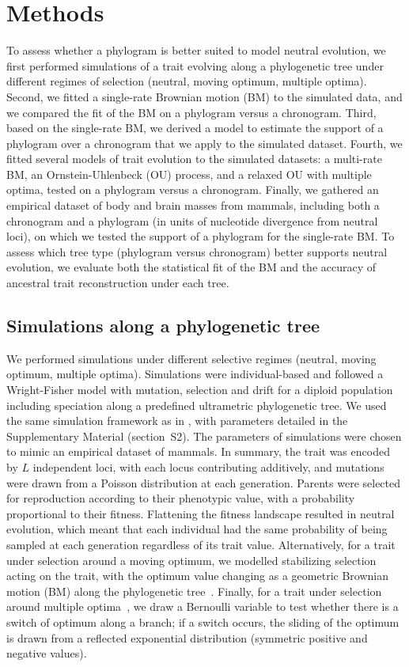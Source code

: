 \documentclass{article}
\newcommand{\NbrLoci}{L}
\begin{document}
\section*{Methods}
To assess whether a phylogram is better suited to model neutral evolution, we first performed simulations of a trait evolving along a phylogenetic tree under different regimes of selection (neutral, moving optimum, multiple optima).
Second, we fitted a single-rate Brownian motion (BM) to the simulated data, and we compared the fit of the BM on a phylogram versus a chronogram.
Third, based on the single-rate BM, we derived a model to estimate the support of a phylogram over a chronogram that we apply to the simulated dataset.
Fourth, we fitted several models of trait evolution to the simulated datasets: a multi-rate BM, an Ornstein-Uhlenbeck (OU) process, and a relaxed OU with multiple optima, tested on a phylogram versus a chronogram.
Finally, we gathered an empirical dataset of body and brain masses from mammals, including both a chronogram and a phylogram (in units of nucleotide divergence from neutral loci), on which we tested the support of a phylogram for the single-rate BM.
To assess which tree type (phylogram versus chronogram) better supports neutral evolution, we evaluate both the statistical fit of the BM and the accuracy of ancestral trait reconstruction under each tree.

\subsection*{Simulations along a phylogenetic tree}
We performed simulations under different selective regimes (neutral, moving optimum, multiple optima).
Simulations were individual-based and followed a Wright-Fisher model with mutation, selection and drift for a diploid population including speciation along a predefined ultrametric phylogenetic tree.
We used the same simulation framework as in \citet{latrille_detecting_2024}, with parameters detailed in the Supplementary Material (section~S2).
The parameters of simulations were chosen to mimic an empirical dataset of mammals.
In summary, the trait was encoded by $\NbrLoci$ independent loci, with each locus contributing additively, and mutations were drawn from a Poisson distribution at each generation.
Parents were selected for reproduction according to their phenotypic value, with a probability proportional to their fitness.
Flattening the fitness landscape resulted in neutral evolution, which meant that each individual had the same probability of being sampled at each generation regardless of its trait value.
Alternatively, for a trait under selection around a moving optimum, we modelled stabilizing selection acting on the trait, with the optimum value changing as a geometric Brownian motion (BM) along the phylogenetic tree~\citep{hansen_stabilizing_1997, hansen_translating_1996}.
Finally, for a trait under selection around multiple optima~\citep{uyeda_novel_2014}, we draw a Bernoulli variable to test whether there is a switch of optimum along a branch; if a switch occurs, the sliding of the optimum is drawn from a reflected exponential distribution (symmetric positive and negative values).
\end{document}
